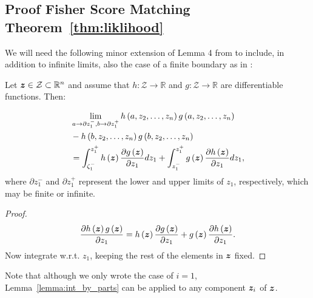 \subsection{Proof Fisher Score Matching Theorem~\ref{thm:liklihood}}\label{sec:lik_score_proof}
We will need the following minor extension of
Lemma 4 from \cite{hyvarinen2005estimation} to include, in addition to infinite limits, also the case of a finite boundary as in \cite{liu2022estimating}: 
\begin{lemma}\label{lemma:int_by_parts} Let $\bm{z}\in\mathcal{Z}\subset\mathbb{R}^n$ {
and assume that 
${h}:\mathcal{Z}\rightarrow\mathbb{R}$ and $g:\mathcal{Z}\rightarrow\mathbb{R}$ are differentiable functions. T}hen: 

    \begin{align}
        &\lim\limits_{a\rightarrow \partial z_1^{-},b\rightarrow \partial z_1^{+}} {h}\left(a,z_2,\hdots,z_n\right)g\left(a,z_2,\hdots,z_n\right)\\
        &-{h}\left(b,z_2,\hdots,z_n\right)g\left(b,z_2,\hdots,z_n\right)\\
        &=\int_{\zeta_1^{-}}^{z_1^{+}}{h}\left(\bm{z}\right)\frac{\partial g\left(\bm{z}\right)}{\partial z_1}dz_1+\int_{z_1^{-}}^{z_1^{+}}g\left(\bm{z}\right)\frac{\partial {h}\left(\bm{z}\right)}{\partial z_1}dz_1,\nonumber
    \end{align}
    where $\partial z_1^{-}$ and $\partial z_1^{+}$ represent the lower and upper limits of $z_1$, respectively{, which may be finite or infinite.}
\end{lemma}
\begin{proof}
    \begin{equation}
        \frac{\partial {h}\left(\bm{z}\right)g\left(\bm{z}\right)}{\partial z_1}={h}\left(\bm{z}\right)\frac{\partial g\left(\bm{z}\right)}{\partial z_1}+g\left(\bm{z}\right)\frac{\partial {h}\left(\bm{z}\right)}{\partial z_1}.
    \end{equation}
    Now integrate w.r.t. $z_1$, 
    keeping %
    the rest of the elements in $\bm{z}$ %
    fixed.
\end{proof}
Note that {although we only wrote the case of $i=1$,}
Lemma~\ref{lemma:int_by_parts} can be applied to any component $\bm{z}_i$ of $\bm{z}$. 

